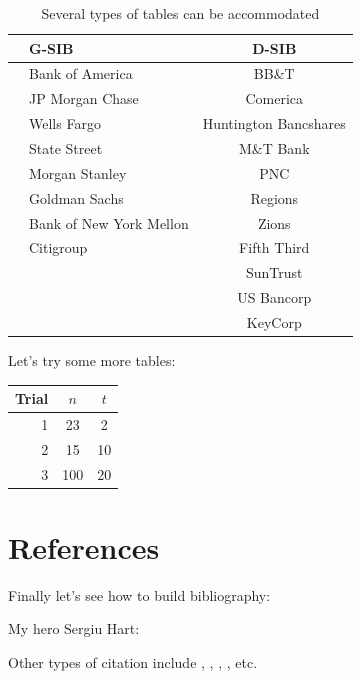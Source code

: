 \documentclass[a4paper,12pt]{article}
\begin{document}
\begin{table}
	\centering 
	\caption{Several types of tables can be accommodated}
	\label{Table:Systemic_Banks}
	\scriptsize{ 
		\begin{tabular}{llc} %
			\hline
			&\textbf{G-SIB}			&\textbf{D-SIB} 		\\   \hline
			&Bank of America			&BB\&T					\\
			&JP Morgan Chase			&Comerica				\\
			&Wells Fargo				&Huntington Bancshares	\\
			&State Street				&M\&T Bank				\\
			&Morgan Stanley				&PNC					\\
			&Goldman Sachs				&Regions				\\
			&Bank of New York Mellon	&Zions					\\
			&Citigroup					&Fifth Third			\\
			&							&SunTrust				\\
			&							&US Bancorp				\\
			&							&KeyCorp				\\\hline
		\end{tabular}
	}
\end{table}


Let's try some more tables:

\begin{table}[ht]
	\centering
	\begin{tabular}{|r||c|c|} \hline
		Trial & $n$ & $t$ \\ \hline
		1 & 23 & 2 \\ \hline
		2 & 15 & 10 \\ \hline
		3 & 100 & 20 \\ \hline
	\end{tabular}
\end{table}

\section{References}

Finally let's see how to build bibliography:

My hero Sergiu Hart: \cite{FH:2009}

Other types of citation include \citep{FRB:2003}, \cite{Brownlees_Engle:2015},
\cite{Haas:2009}, \cite{Rachev:2005b}, \nocite{Fahlenbrach_et_al:2016} etc.



\end{document}
